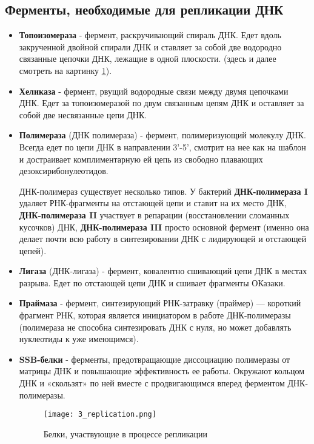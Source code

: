 \subsection{Ферменты, необходимые для репликации ДНК}

\begin{itemize}

    \item \textbf{Топоизомераза} - фермент, раскручивающий спираль ДНК. Едет вдоль закрученной двойной спирали ДНК и ставляет за собой две водородно связанные цепочки ДНК, лежащие в одной плоскости. (здесь и далее смотреть на картинку \ref{fig:3_rep}).
    
    \item \textbf{Хеликаза} - фермент, рвущий водородные связи между двумя цепочками ДНК. Едет за топоизомеразой по двум связанным цепям ДНК и оставляет за собой две несвязанные цепи ДНК.
    
    \item \textbf{Полимераза} (ДНК полимераза) - фермент, полимеризующий молекулу ДНК. Всегда едет по цепи ДНК в направлении 3'-5', смотрит на нее как на шаблон и достраивает комплиментарную ей цепь из свободно плавающих дезоксирибонулеотидов. 
    
    ДНК-полимераз существует несколько типов. У бактерий \textbf{ДНК-полимераза I} удаляет РНК-фрагменты на отстающей цепи и ставит на их место ДНК, \textbf{ДНК-полимераза II} участвует в репарации (восстановлении сломанных кусочков) ДНК, \textbf{ДНК-полимераза III} просто основной фермент (именно она делает почти всю работу в синтезировании ДНК с лидирующей и отстающей цепей).
    
    \item \textbf{Лигаза} (ДНК-лигаза) - фермент, ковалентно сшивающий цепи ДНК в местах разрыва. Едет по отстающей цепи ДНК и сшивает фрагменты ОКазаки. 
    
    \item \textbf{Праймаза} - фермент, синтезирующий РНК-затравку (праймер) — короткий фрагмент РНК, которая является инициатором в работе ДНК-полимеразы (полимераза не способна синтезировать ДНК с нуля, но может добавлять нуклеотиды к уже имеющимся). 
    
    \item \textbf{SSB-белки} - ферменты, предотвращающие диссоциацию полимеразы от матрицы ДНК и повышающие эффективность ее работы. Окружают кольцом ДНК и «скользят» по ней вместе с продвигающимся вперед ферментом ДНК-полимеразы. 
    
    \begin{figure}[H]
        \centering
        \texttt{[image: 3\_replication.png]}
        \caption{Белки, участвующие в процессе репликации}
        \label{fig:3_rep}
    \end{figure}
    
\end{itemize}

